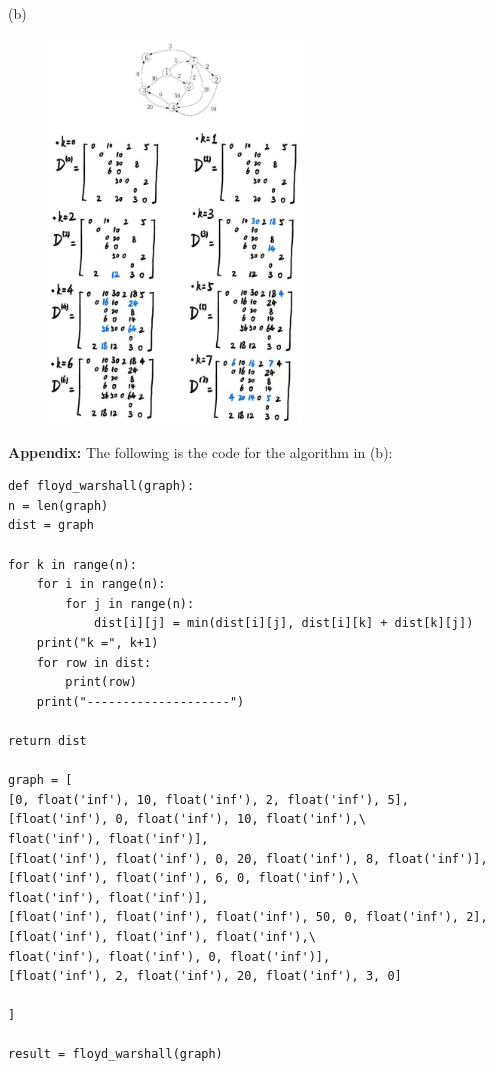 \documentclass[10pt]{article}
\begin{document}
\newpage
(b)
\begin{figure}[H]
	\centering
	\includegraphics[width=0.6\textwidth]{hw4-4-ans(2)}
\end{figure}

\newpage
\textbf{Appendix:} The following is the code for the algorithm in (b):

\lstset{language=Python}
\begin{lstlisting}[tabsize=4]
def floyd_warshall(graph):
n = len(graph)
dist = graph

for k in range(n):
	for i in range(n):
		for j in range(n):
			dist[i][j] = min(dist[i][j], dist[i][k] + dist[k][j])
	print("k =", k+1)
	for row in dist:
		print(row)
	print("--------------------")

return dist

graph = [
[0, float('inf'), 10, float('inf'), 2, float('inf'), 5],
[float('inf'), 0, float('inf'), 10, float('inf'),\
float('inf'), float('inf')],
[float('inf'), float('inf'), 0, 20, float('inf'), 8, float('inf')],
[float('inf'), float('inf'), 6, 0, float('inf'),\
float('inf'), float('inf')],
[float('inf'), float('inf'), float('inf'), 50, 0, float('inf'), 2],
[float('inf'), float('inf'), float('inf'),\
float('inf'), float('inf'), 0, float('inf')],
[float('inf'), 2, float('inf'), 20, float('inf'), 3, 0]

]

result = floyd_warshall(graph)
\end{lstlisting}
\end{document}
